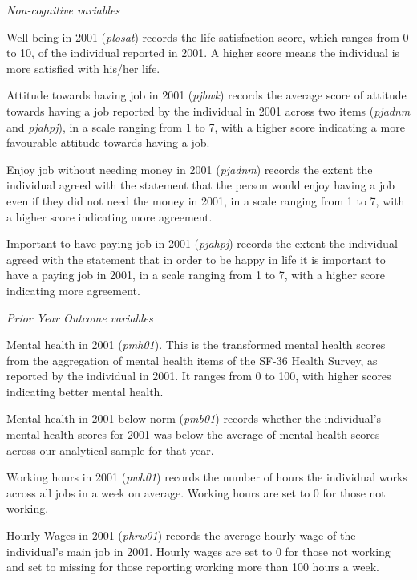 \documentclass[12pt, a4paper]{article}
\begin{document}
\emph{Non-cognitive variables}

Well-being in 2001 (\textit{p\textunderscore{}losat}) records the life satisfaction score, which ranges from 0 to 10, of the individual reported in 2001. A higher score means the individual is more satisfied with his/her life.

Attitude towards having job in 2001 (\textit{p\textunderscore{}jbwk}) records the average score of attitude towards having a job reported by the individual in 2001 across two items (\textit{p\textunderscore{}jadnm} and \textit{p\textunderscore{}jahpj}), in a scale ranging from 1 to 7, with a higher score indicating a more favourable attitude towards having a job. 

Enjoy job without needing money in 2001 (\textit{p\textunderscore{}jadnm}) records the extent the individual agreed with the statement that the person would enjoy having a job even if they did not need the money in 2001, in a scale ranging from 1 to 7, with a higher score indicating more agreement.

Important to have paying job in 2001 (\textit{p\textunderscore{}jahpj}) records the extent the individual agreed with the statement that in order to be happy in life it is important to have a paying job in 2001, in a scale ranging from 1 to 7, with a higher score indicating more agreement.

\emph{Prior Year Outcome variables}

Mental health in 2001 (\textit{p\textunderscore{}mh01}). This is the transformed mental health scores from the aggregation of mental health items of the SF-36 Health Survey, as reported by the individual in 2001. It ranges from 0 to 100, with higher scores indicating better mental health.   

Mental health in 2001 below norm (\textit{p\textunderscore{}mb01}) records whether the individual’s mental health scores for 2001 was below the average of mental health scores across our analytical sample for that year. 

Working hours in 2001 (\textit{p\textunderscore{}wh01}) records the number of hours the individual works across all jobs in a week on average. Working hours are set to 0 for those not working.

Hourly Wages in 2001 (\textit{p\textunderscore{}hrw01}) records the average hourly wage of the individual’s main job in 2001. Hourly wages are set to 0 for those not working and set to missing for those reporting working more than 100 hours a week. 
\end{document}
